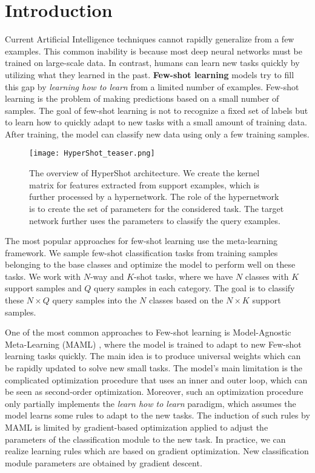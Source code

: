 \documentclass[nohyperref]{article}
\def\our{HyperShot}
\theoremstyle{plain}
\theoremstyle{definition}
\theoremstyle{remark}
\begin{document}
\section{Introduction}
\label{intro}


Current Artificial Intelligence techniques cannot rapidly generalize from a few examples. This common inability is because most deep neural networks must be trained on large-scale data. In contrast, humans can learn new tasks quickly by utilizing what they learned in the past. {\bf Few-shot learning} models try to fill this gap by \textit{learning how to learn} from a limited number of examples.
Few-shot learning is the problem of making predictions based on a small number of samples. The goal of few-shot learning is not to recognize a fixed set of labels but to learn how to quickly adapt to new tasks with a small amount of training data. After training, the model can classify new data using only a few training samples.



\begin{figure*}[t]
    \vskip 0.2in
    \begin{center}
    \centerline{\texttt{[image: HyperShot\_teaser.png]}}
    \caption{The overview of \our{} architecture. We create the kernel matrix for features extracted from support examples, which is further processed by a hypernetwork. The role of the hypernetwork is to create the set of parameters for the considered task. The target network further uses the parameters to classify the query examples. }
    \label{fig:teaser}
    \end{center}
    \vskip -0.3in
\end{figure*}

The most popular approaches for few-shot learning use the meta-learning framework. We sample few-shot classification tasks from training samples belonging to the base classes and optimize the model to perform well on these tasks.
We work with $N$-way and $K$-shot tasks, where we have $N$ classes with $K$ support samples and $Q$ query samples in each category.
The goal is to classify these $N \times Q$ query samples into the $N$ classes based on the $N \times K$ support samples.

One of the most common approaches to Few-shot learning is Model-Agnostic Meta-Learning (MAML) \cite{finn2017model}, where the model is trained to adapt to new Few-shot learning tasks quickly. The main idea is to produce universal weights which can be rapidly updated to solve new small tasks. The model's main limitation is the complicated optimization procedure that uses an inner and outer loop, which can be seen as second-order optimization.
Moreover, such an optimization procedure only partially implements the \emph{learn how to learn} paradigm, which assumes the model learns some rules to adapt to the new tasks. The induction of such rules by MAML is limited by gradient-based optimization applied to adjust the parameters of the classification module to the new task. In practice, we can realize learning rules which are based on gradient optimization. New classification module parameters are obtained by gradient descent. 
\end{document}
